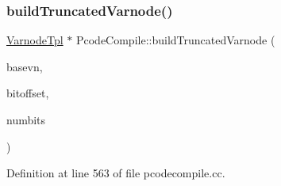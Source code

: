 \subsubsection{\texorpdfstring{buildTruncatedVarnode()}{buildTruncatedVarnode()}}
{\footnotesize\ttfamily \mbox{\hyperlink{class_varnode_tpl}{Varnode\+Tpl}} $\ast$ Pcode\+Compile\+::build\+Truncated\+Varnode (\begin{DoxyParamCaption}\item[{\mbox{\hyperlink{class_varnode_tpl}{Varnode\+Tpl}} $\ast$}]{basevn,  }\item[{uint4}]{bitoffset,  }\item[{uint4}]{numbits }\end{DoxyParamCaption})}



Definition at line 563 of file pcodecompile.\+cc.

